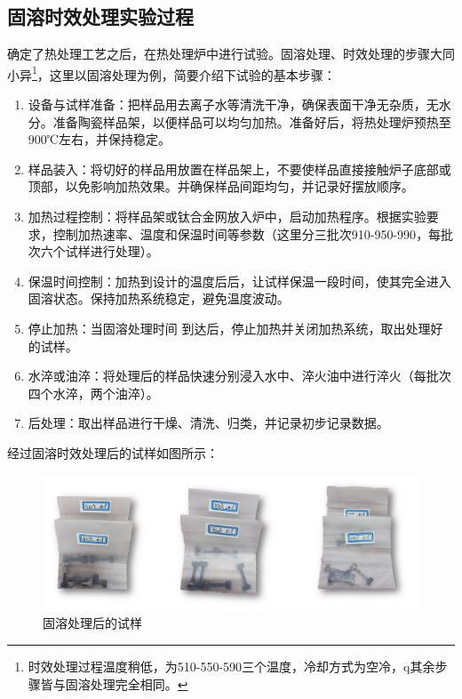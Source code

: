 

\subsection{固溶时效处理实验过程}
确定了热处理工艺之后，在热处理炉中进行试验。固溶处理、时效处理的步骤大同小异\footnote{时效处理过程温度稍低，为{510-550-590}三个温度，冷却方式为空冷，q其余步骤皆与固溶处理完全相同。}，这里以固溶处理为例，简要介绍下试验的基本步骤：
\begin{enumerate}
	\item 设备与试样准备：把样品用去离子水等清洗干净，确保表面干净无杂质，无水分。准备陶瓷样品架，以便样品可以均匀加热。准备好后，将热处理炉预热至900℃左右，并保持稳定。
	\item 样品装入：将切好的样品用放置在样品架上，不要使样品直接接触炉子底部或顶部，以免影响加热效果。并确保样品间距均匀，并记录好摆放顺序。
	\item 加热过程控制：将样品架或钛合金网放入炉中，启动加热程序。根据实验要求，控制加热速率、温度和保温时间等参数（这里分三批次{910-950-990}，每批次六个试样进行处理）。
	\item 保温时间控制：加热到设计的温度后后，让试样保温一段时间，使其完全进入固溶状态。保持加热系统稳定，避免温度波动。
	\item 停止加热：当固溶处理时间	到达后，停止加热并关闭加热系统，取出处理好的试样。%
	\item 水淬或油淬：将处理后的样品快速分别浸入水中、淬火油中进行淬火（每批次四个水淬，两个油淬）。
	\item 后处理：取出样品进行干燥、清洗、归类，并记录初步记录数据。
\end{enumerate}
经过固溶时效处理后的试样如图所示：

\begin{figure}[h!]
	\centering
	\includegraphics[width=0.7\linewidth]{pic/固溶处理后的试样}
	\caption{固溶处理后的试样}
	\label{fig: aftergurong}
\end{figure}



